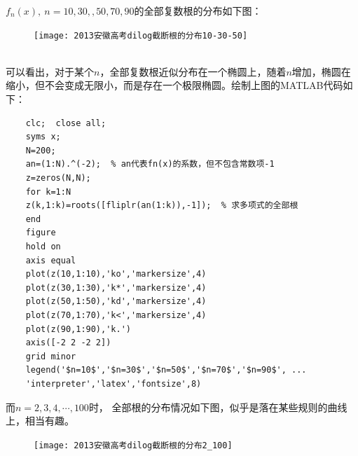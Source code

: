 \begin{enumerate}[label={【\textbf{例\thechapter.\arabic*}】},
 leftmargin=\inteval{\myenumleftmargin}pt,
 itemsep=\inteval{\myenumitempsep}pt,
 itemindent=\inteval{\myenumitemindent}pt]
$ f_n(x),\ n=10,30,,50,70,90 $的全部复数根的分布如下图：
\begin{figure}[h]
    \centering
    \texttt{[image: 2013安徽高考dilog截断根的分布10-30-50]}
\end{figure} \\
可以看出，对于某个$ n $，全部复数根近似分布在一个椭圆上，随着$ n $增加，椭圆在缩小，但不会变成无限小，而是存在一个极限椭圆。绘制上图的MATLAB代码如下：
\begin{lstlisting}
    clc;  close all;
    syms x; 
    N=200;
    an=(1:N).^(-2);  % an代表fn(x)的系数，但不包含常数项-1
    z=zeros(N,N);
    for k=1:N
    z(k,1:k)=roots([fliplr(an(1:k)),-1]);  % 求多项式的全部根
    end
    figure 
    hold on
    axis equal
    plot(z(10,1:10),'ko','markersize',4)
    plot(z(30,1:30),'k*','markersize',4)
    plot(z(50,1:50),'kd','markersize',4)
    plot(z(70,1:70),'k<','markersize',4)
    plot(z(90,1:90),'k.')
    axis([-2 2 -2 2])
    grid minor
    legend('$n=10$','$n=30$','$n=50$','$n=70$','$n=90$', ...
    'interpreter','latex','fontsize',8)
\end{lstlisting} 
而$ n=2,3,4,\cdots,100 $时，
全部根的分布情况如下图，似乎是落在某些规则的曲线上，相当有趣。
\begin{figure}[H]
    \centering
    \texttt{[image: 2013安徽高考dilog截断根的分布2\_100]}
\end{figure} 


\end{enumerate}
